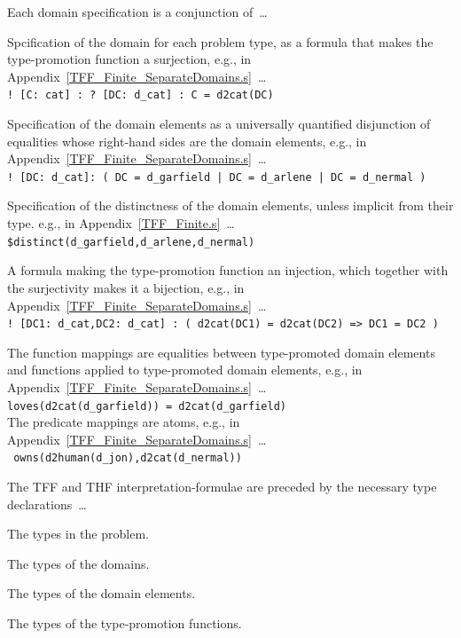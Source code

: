 \documentclass{easychair}
\newcommand{\smalltt}[1]{\small \texttt{#1}}
\newenvironment{packed_itemize}{
\vspace*{-0.3em}
\begin{itemize}
\setlength{\partopsep}{0pt}
\setlength{\itemsep}{1pt}
\setlength{\parskip}{0pt}
\setlength{\parsep}{0pt}
}{\end{itemize}}
\begin{document}
Each domain specification is a conjunction of~\ldots
\begin{packed_itemize}
\item Spcification of the domain for each problem type, as a formula that makes the 
      type-promotion function a surjection, 
      e.g., in Appendix~\ref{TFF_Finite_SeparateDomains.s}~\ldots\\
      \hspace*{0.5cm}\smalltt{! [C: cat] : ? [DC: d\_cat] : C = d2cat(DC)}
\item Specification of the domain elements as a universally quantified disjunction of equalities 
      whose right-hand sides are the domain elements, 
      e.g., in Appendix~\ref{TFF_Finite_SeparateDomains.s}~\ldots\\
      \hspace*{0.5cm}\smalltt{! [DC: d\_cat]: ( DC = d\_garfield | DC = d\_arlene | DC = d\_nermal )}
\item Specification of the distinctness of the domain elements, unless implicit from their type.
      e.g., in Appendix~\ref{TFF_Finite.s}~\ldots\\
      \hspace*{0.5cm}\smalltt{\$distinct(d\_garfield,d\_arlene,d\_nermal)}
\item A formula making the type-promotion function an injection, which together with the 
      surjectivity makes it a bijection, 
      e.g., in Appendix~\ref{TFF_Finite_SeparateDomains.s}~\ldots\\
      \hspace*{0.5cm}\smalltt{! [DC1: d\_cat,DC2: d\_cat] : ( d2cat(DC1) = d2cat(DC2) => DC1 = DC2 )}
\end{packed_itemize}

The function mappings are equalities between type-promoted domain elements and functions applied 
to type-promoted domain elements, 
e.g., in Appendix~\ref{TFF_Finite_SeparateDomains.s}~\ldots \\
\hspace*{0.5cm}\smalltt{loves(d2cat(d\_garfield)) = d2cat(d\_garfield)}\\
The predicate mappings are atoms, 
e.g., in Appendix~\ref{TFF_Finite_SeparateDomains.s}~\ldots \\
\hspace*{0.5cm}\smalltt{{\raisebox{0.4ex}{\texttildelow}}\,owns(d2human(d\_jon),d2cat(d\_nermal))}

The TFF and THF interpretation-formulae are preceded by the necessary type declarations~\ldots
\begin{packed_itemize}
\item The types in the problem.
\item The types of the domains.
\item The types of the domain elements.
\item The types of the type-promotion functions.
\end{packed_itemize}
\end{document}
